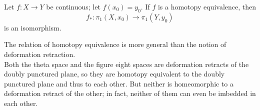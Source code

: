 \begin{theorem}
Let $f\colon X \rightarrow Y$ be continuous; let $f(x_0) = y_0$. If $f$ is a homotopy equivalence, then
\[
    f_{\ast} \colon \pi _1(X, x_0) \rightarrow \pi _1(Y, y_0)
\]
is an isomorphism.
\end{theorem}

\begin{remark}
The relation of homotopy equivalence is more general than the notion of deformation retraction. \\

Both the theta space and the figure eight spaces are deformation retracts of the doubly punctured plane, so they are homotopy equivalent to the doubly punctured plane and thus to each other. But neither is homeomorphic to a deformation retract of the other; in fact, neither of them can even be imbedded in each other. 
\end{remark}